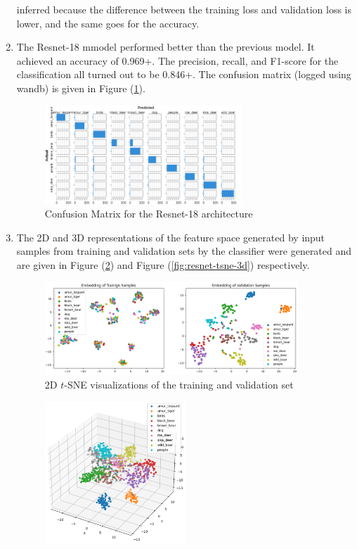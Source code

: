\documentclass[10pt]{article}
\begin{document}
\begin{enumerate}[label=(\alph*)]
        inferred because the difference between the training loss and validation loss
        is lower, and the same goes for the accuracy.
        \item The Resnet-18 mmodel performed better than the previous model. It achieved
        an accuracy of 0.969+. The precision, recall, and F1-score for the classification
        all turned out to be 0.846+. The confusion matrix (logged using wandb) is given in
        Figure (\ref{fig:resnet-conf-matrix}).
        \begin{figure}[h!]
            \centering
            \includegraphics[width=0.7\textwidth]{Assets/Classification/Resnet/05}
            \caption{Confusion Matrix for the Resnet-18 architecture}
            \label{fig:resnet-conf-matrix}
        \end{figure}
        \item The 2D and 3D representations of the feature space generated by input samples
        from training and validation sets by the classifier were generated and are given in
        Figure (\ref{fig:resnet-tsne-2d}) and Figure (\ref{fig:resnet-tsne-3d}) respectively.
        \begin{figure}[h!]
            \centering
            \includegraphics[width=0.9\textwidth]{Assets/Classification/Resnet/06}
            \caption{2D $t$-SNE visualizations of the training and validation set}
            \label{fig:resnet-tsne-2d}
        \end{figure}
        \begin{figure}[h!]
            \centering
            \includegraphics[width=0.5\textwidth]{Assets/Classification/Resnet/07}

\end{figure}
\end{enumerate}
\end{document}
